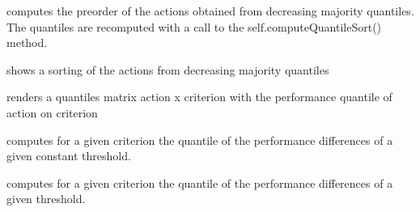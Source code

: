 \documentclass[letterpaper,10pt,english]{sphinxmanual}
\begin{document}
\begin{fulllineitems}
\begin{fulllineitems}
\end{fulllineitems}


\begin{fulllineitems}
\label{techDoc:perfTabs.PerformanceTableau.computeQuantilePreorder}
computes the preorder of the actions obtained from decreasing majority quantiles. The quantiles are recomputed with a call to the self.computeQuantileSort() method.

\end{fulllineitems}


\begin{fulllineitems}
\label{techDoc:perfTabs.PerformanceTableau.computeQuantileSort}
shows a sorting of the actions from decreasing majority quantiles

\end{fulllineitems}


\begin{fulllineitems}
\label{techDoc:perfTabs.PerformanceTableau.computeQuantiles}
renders a quantiles matrix action x criterion with the performance quantile of action on criterion

\end{fulllineitems}


\begin{fulllineitems}
\label{techDoc:perfTabs.PerformanceTableau.computeThresholdPercentile}
computes for a given criterion the quantile
of the performance differences of a given constant threshold.

\end{fulllineitems}


\begin{fulllineitems}
\label{techDoc:perfTabs.PerformanceTableau.computeVariableThresholdPercentile}
computes for a given criterion the quantile
of the performance differences of a given threshold.


\end{fulllineitems}
\end{fulllineitems}
\end{document}
